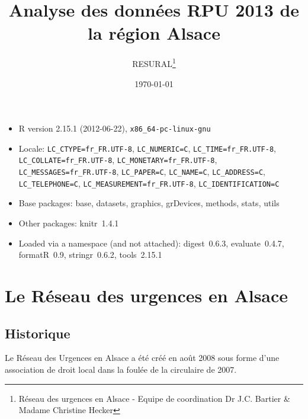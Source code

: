\documentclass[12pt,english,french,twoside]{report}\usepackage[]{graphicx}\usepackage[]{color}
\begin{document}
\title{Analyse des données RPU 2013 de la région Alsace}
\author{RESURAL\thanks{Réseau des urgences en Alsace - Equipe de coordination Dr J.C.
Bartier \& Madame Christine Hecker}}
\date{\today}
\maketitle


\newpage

\begin{itemize}\raggedright
  \item R version 2.15.1 (2012-06-22), \verb|x86_64-pc-linux-gnu|
  \item Locale: \verb|LC_CTYPE=fr_FR.UTF-8|, \verb|LC_NUMERIC=C|, \verb|LC_TIME=fr_FR.UTF-8|, \verb|LC_COLLATE=fr_FR.UTF-8|, \verb|LC_MONETARY=fr_FR.UTF-8|, \verb|LC_MESSAGES=fr_FR.UTF-8|, \verb|LC_PAPER=C|, \verb|LC_NAME=C|, \verb|LC_ADDRESS=C|, \verb|LC_TELEPHONE=C|, \verb|LC_MEASUREMENT=fr_FR.UTF-8|, \verb|LC_IDENTIFICATION=C|
  \item Base packages: base, datasets, graphics, grDevices,
    methods, stats, utils
  \item Other packages: knitr~1.4.1
  \item Loaded via a namespace (and not attached): digest~0.6.3,
    evaluate~0.4.7, formatR~0.9, stringr~0.6.2, tools~2.15.1
\end{itemize}



\tableofcontents
\listoftables
\listoffigures



\part{Le Réseau des urgences en Alsace}

\chapter{Historique}


Le Réseau des Urgences en Alsace a été créé en août 2008 sous forme d'une association de droit local dans la foulée de la circulaire de 2007.

\end{document}
